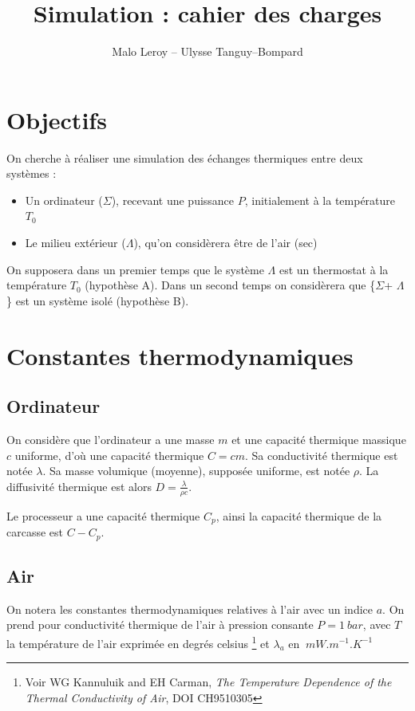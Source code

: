\documentclass{article}
\title{Simulation : cahier des charges}
\author{Malo Leroy -- Ulysse Tanguy--Bompard}
\newcommand{\air}{$\Lambda$\xspace}
\newcommand{\ordi}{$\Sigma$\xspace}
\begin{document}
\maketitle

\section{Objectifs}

On cherche à réaliser une simulation des échanges thermiques entre deux systèmes :
\begin{itemize}
    \item Un ordinateur (\ordi), recevant  une puissance $P$, initialement à la température $T_0$
    \item Le milieu extérieur (\air), qu'on considèrera être de l'air (sec)
\end{itemize}

On supposera dans un premier temps que le système \air est un thermostat à la température $T_0$ (hypothèse A). Dans un second temps on considèrera que \{\ordi + $\Lambda$\} est un système isolé (hypothèse B).

\section{Constantes thermodynamiques}

\subsection{Ordinateur}

On considère que l'ordinateur a une masse $m$ et une capacité thermique massique $c$ uniforme, d'où une capacité thermique $C = c m$. Sa conductivité thermique est notée $\lambda$. Sa masse volumique (moyenne), supposée uniforme, est notée $\rho$. La diffusivité thermique est alors $D = \frac{\lambda} {\rho c}$.

Le processeur a une capacité thermique $C_p$, ainsi la capacité thermique de la carcasse est $C - C_p$.

\subsection{Air}

On notera les constantes thermodynamiques relatives à l'air avec un indice $a$. On prend pour conductivité thermique de l'air à pression consante $P = \SI{1}{bar}$, avec $T$ la température de l'air exprimée en degrés celsius \footnote{Voir  WG Kannuluik and EH Carman, \textit{The Temperature Dependence of the Thermal Conductivity of Air}, DOI CH9510305} et $\lambda_{a}$ en $\SI{}{mW.m^{-1}.K^{-1}}$
\end{document}
